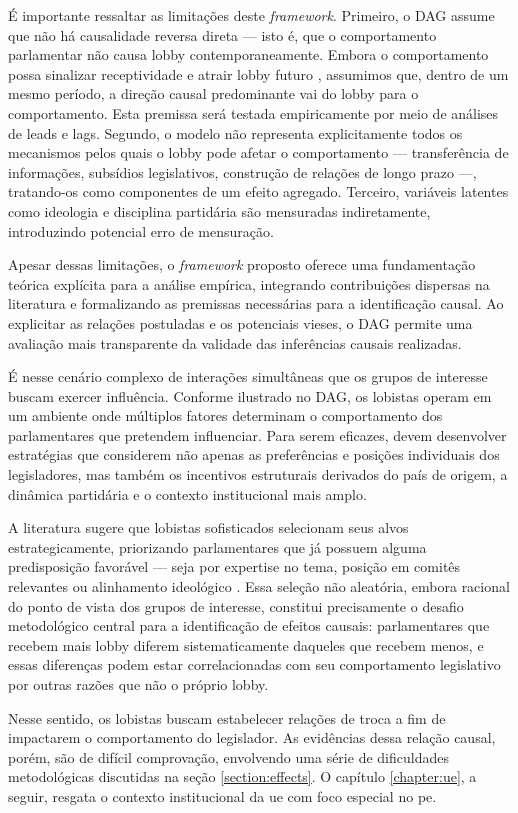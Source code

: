 É importante ressaltar as limitações deste \textit{framework}. Primeiro, o DAG assume que não há causalidade reversa direta — isto é, que o comportamento parlamentar não causa lobby contemporaneamente. Embora o comportamento possa sinalizar receptividade e atrair lobby futuro \cite{wright1996contributions}, assumimos que, dentro de um mesmo período, a direção causal predominante vai do lobby para o comportamento. Esta premissa será testada empiricamente por meio de análises de leads e lags. Segundo, o modelo não representa explicitamente todos os mecanismos pelos quais o lobby pode afetar o comportamento — transferência de informações, subsídios legislativos, construção de relações de longo prazo —, tratando-os como componentes de um efeito agregado. Terceiro, variáveis latentes como ideologia e disciplina partidária são mensuradas indiretamente, introduzindo potencial erro de mensuração.

Apesar dessas limitações, o \textit{framework} proposto oferece uma fundamentação teórica explícita para a análise empírica, integrando contribuições dispersas na literatura e formalizando as premissas necessárias para a identificação causal. Ao explicitar as relações postuladas e os potenciais vieses, o DAG permite uma avaliação mais transparente da validade das inferências causais realizadas.

É nesse cenário complexo de interações simultâneas que os grupos de interesse buscam exercer influência. Conforme ilustrado no DAG, os lobistas operam em um ambiente onde múltiplos fatores determinam o comportamento dos parlamentares que pretendem influenciar. Para serem eficazes, devem desenvolver estratégias que considerem não apenas as preferências e posições individuais dos legisladores, mas também os incentivos estruturais derivados do país de origem, a dinâmica partidária e o contexto institucional mais amplo.

A literatura sugere que lobistas sofisticados selecionam seus alvos estrategicamente, priorizando parlamentares que já possuem alguma predisposição favorável — seja por expertise no tema, posição em comitês relevantes ou alinhamento ideológico \cite{Hall2006}. Essa seleção não aleatória, embora racional do ponto de vista dos grupos de interesse, constitui precisamente o desafio metodológico central para a identificação de efeitos causais: parlamentares que recebem mais lobby diferem sistematicamente daqueles que recebem menos, e essas diferenças podem estar correlacionadas com seu comportamento legislativo por outras razões que não o próprio lobby.

Nesse sentido, os lobistas buscam estabelecer relações de troca \cite{huwyler_no_2023} a fim de impactarem o comportamento do legislador. As evidências dessa relação causal, porém, são de difícil comprovação, envolvendo uma série de dificuldades metodológicas discutidas na seção \ref{section:effects}. O capítulo \ref{chapter:ue}, a seguir, resgata o contexto institucional da \acrshort{ue} com foco especial no \acrshort{pe}.
